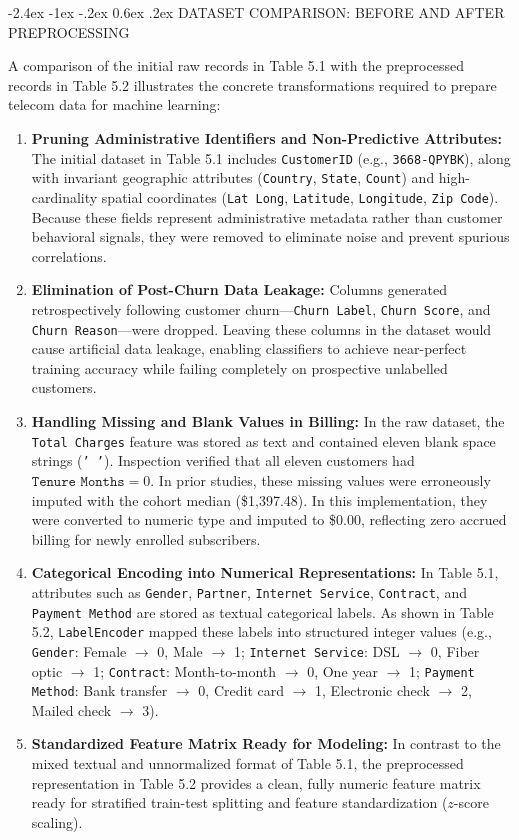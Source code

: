 \documentclass[12pt,oneside]{report}
\makeatletter
\renewcommand{\section}{\@startsection{section}{1}{\z@}%
  {-2.4ex \@plus -1ex \@minus -.2ex}%
  {0.6ex \@plus .2ex}%
  {\normalfont\large\bfseries}}
\makeatother
\begin{document}
\section{DATASET COMPARISON: BEFORE AND AFTER PREPROCESSING}

A comparison of the initial raw records in Table 5.1 with the preprocessed records in Table 5.2 illustrates the concrete transformations required to prepare telecom data for machine learning:
\begin{enumerate}
    \item \textbf{Pruning Administrative Identifiers and Non-Predictive Attributes:} The initial dataset in Table 5.1 includes \texttt{CustomerID} (e.g., \texttt{3668-QPYBK}), along with invariant geographic attributes (\texttt{Country}, \texttt{State}, \texttt{Count}) and high-cardinality spatial coordinates (\texttt{Lat Long}, \texttt{Latitude}, \texttt{Longitude}, \texttt{Zip Code}). Because these fields represent administrative metadata rather than customer behavioral signals, they were removed to eliminate noise and prevent spurious correlations.
    \item \textbf{Elimination of Post-Churn Data Leakage:} Columns generated retrospectively following customer churn---\texttt{Churn Label}, \texttt{Churn Score}, and \texttt{Churn Reason}---were dropped. Leaving these columns in the dataset would cause artificial data leakage, enabling classifiers to achieve near-perfect training accuracy while failing completely on prospective unlabelled customers.
    \item \textbf{Handling Missing and Blank Values in Billing:} In the raw dataset, the \texttt{Total Charges} feature was stored as text and contained eleven blank space strings (\texttt{' '}). Inspection verified that all eleven customers had $\texttt{Tenure Months} = 0$. In prior studies, these missing values were erroneously imputed with the cohort median (\$1,397.48). In this implementation, they were converted to numeric type and imputed to \$0.00, reflecting zero accrued billing for newly enrolled subscribers.
    \item \textbf{Categorical Encoding into Numerical Representations:} In Table 5.1, attributes such as \texttt{Gender}, \texttt{Partner}, \texttt{Internet Service}, \texttt{Contract}, and \texttt{Payment Method} are stored as textual categorical labels. As shown in Table 5.2, \texttt{LabelEncoder} mapped these labels into structured integer values (e.g., \texttt{Gender}: Female $\to$ 0, Male $\to$ 1; \texttt{Internet Service}: DSL $\to$ 0, Fiber optic $\to$ 1; \texttt{Contract}: Month-to-month $\to$ 0, One year $\to$ 1; \texttt{Payment Method}: Bank transfer $\to$ 0, Credit card $\to$ 1, Electronic check $\to$ 2, Mailed check $\to$ 3).
    \item \textbf{Standardized Feature Matrix Ready for Modeling:} In contrast to the mixed textual and unnormalized format of Table 5.1, the preprocessed representation in Table 5.2 provides a clean, fully numeric feature matrix ready for stratified train-test splitting and feature standardization ($z$-score scaling).
\end{enumerate}
\end{document}
